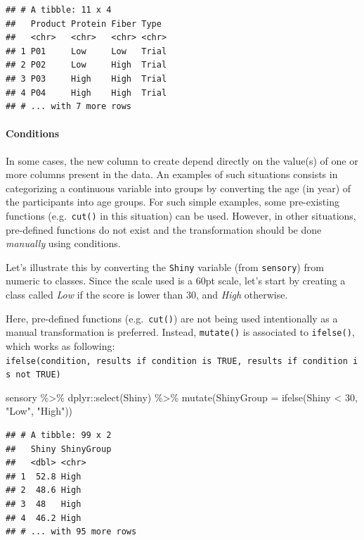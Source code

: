 \documentclass[
]{krantz}
\makeatletter
\newenvironment{Shaded}{\begin{snugshade}}{\end{snugshade}}
\newcommand{\AttributeTok}[1]{\textcolor[rgb]{0.61,0.61,0.61}{#1}}
\newcommand{\DecValTok}[1]{\textcolor[rgb]{0.06,0.06,0.06}{#1}}
\newcommand{\FunctionTok}[1]{\textcolor[rgb]{0,0,0}{#1}}
\newcommand{\NormalTok}[1]{#1}
\newcommand{\SpecialCharTok}[1]{\textcolor[rgb]{0,0,0}{#1}}
\newcommand{\StringTok}[1]{\textcolor[rgb]{0.5,0.5,0.5}{#1}}
\newenvironment{kframe}{%
\medskip{}
\setlength{\fboxsep}{.8em}
 \def\at@end@of@kframe{}%
 \ifinner\ifhmode%
  \def\at@end@of@kframe{\end{minipage}}%
  \begin{minipage}{\columnwidth}%
 \fi\fi%
 \def\FrameCommand##1{\hskip\@totalleftmargin \hskip-\fboxsep
 \colorbox{shadecolor}{##1}\hskip-\fboxsep
     \hskip-\linewidth \hskip-\@totalleftmargin \hskip\columnwidth}%
 \MakeFramed {\advance\hsize-\width
   \@totalleftmargin\z@ \linewidth\hsize
   \@setminipage}}%
 {\par\unskip\endMakeFramed%
 \at@end@of@kframe}
\renewenvironment{Shaded}{\begin{kframe}}{\end{kframe}}
\makeatother
\begin{document}
\begin{verbatim}
## # A tibble: 11 x 4
##   Product Protein Fiber Type 
##   <chr>   <chr>   <chr> <chr>
## 1 P01     Low     Low   Trial
## 2 P02     Low     High  Trial
## 3 P03     High    High  Trial
## 4 P04     High    High  Trial
## # ... with 7 more rows
\end{verbatim}

\hypertarget{conditions}{%
\paragraph*{Conditions}\label{conditions}}

In some cases, the new column to create depend directly on the value(s) of one or more columns present in the data.
An examples of such situations consists in categorizing a continuous variable into groups by converting the age (in year) of the participants into age groups. For such simple examples, some pre-existing functions (e.g.~\texttt{cut()} in this situation) can be used.
However, in other situations, pre-defined functions do not exist and the transformation should be done \emph{manually} using conditions.

Let's illustrate this by converting the \texttt{Shiny} variable (from \texttt{sensory}) from numeric to classes.
Since the scale used is a 60pt scale, let's start by creating a class called \emph{Low} if the score is lower than 30, and \emph{High} otherwise.

Here, pre-defined functions (e.g.~\texttt{cut()}) are not being used intentionally as a manual transformation is preferred. Instead, \texttt{mutate()} is associated to \texttt{ifelse()}, which works as following: \texttt{ifelse(condition,\ results\ if\ condition\ is\ TRUE,\ results\ if\ condition\ is\ not\ TRUE)}

\begin{Shaded}
\begin{Highlighting}[]
\NormalTok{sensory }\SpecialCharTok{\%\textgreater{}\%}
\NormalTok{  dplyr}\SpecialCharTok{::}\FunctionTok{select}\NormalTok{(Shiny) }\SpecialCharTok{\%\textgreater{}\%}
  \FunctionTok{mutate}\NormalTok{(}\AttributeTok{ShinyGroup =} \FunctionTok{ifelse}\NormalTok{(Shiny }\SpecialCharTok{\textless{}} \DecValTok{30}\NormalTok{, }\StringTok{"Low"}\NormalTok{, }\StringTok{"High"}\NormalTok{))}
\end{Highlighting}
\end{Shaded}

\begin{verbatim}
## # A tibble: 99 x 2
##   Shiny ShinyGroup
##   <dbl> <chr>     
## 1  52.8 High      
## 2  48.6 High      
## 3  48   High      
## 4  46.2 High      
## # ... with 95 more rows
\end{verbatim}
\end{document}
